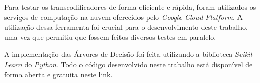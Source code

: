 {Para testar os transcodificadores de forma eficiente e rápida, foram utilizados os serviços de computação na nuvem oferecidos pelo \textit{Google Cloud Platform}. A utilização dessa ferramenta foi crucial para o desenvolvimento deste trabalho, uma vez que permitiu que fossem feitos diversos testes em paralelo.

A implementação das Árvores de Decisão foi feita utilizando a biblioteca \textit{Scikit-Learn} do \textit{Python}. Todo o código desenvolvido neste trabalho está disponível de forma aberta e gratuita neste \href{https://github.com/thiagodma/DecisionTrees-Python}{link}.

\begin{singlespace}
{\setfonttimes\normalsize{}}
\end{singlespace}
}
\vspace{2cm}
